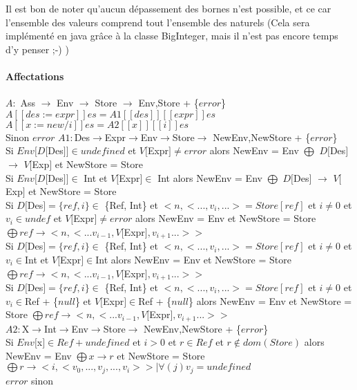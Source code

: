 Il est bon de noter qu'aucun dépassement des bornes n'est possible, et ce car l'ensemble des valeurs comprend tout l'ensemble des naturels (Cela sera implémenté en java grâce à la classe BigInteger, mais il n'est pas encore temps d'y penser ;-) )

\paragraph{Affectations} $A :$ Ass $\rightarrow$  Env $\rightarrow$ Store $\rightarrow$ {Env,Store} + \{$error$\}  \\
$A[[des := expr]] e s = A1[[des]][[expr]] e s$\\
$A[[x := new/i ]] e s = A2[[x]][[i]] e s$\\
Sinon $error$
\newline
$A1 : $Des$ \rightarrow $Expr$ \rightarrow $Env$ \rightarrow $Store$ \rightarrow$ {NewEnv,NewStore} + \{$error$\} \\ 
Si $Env[D[$Des$]] \in {undefined}$ et $V[$Expr$] \neq error$ alors NewEnv = Env $\bigoplus$ $D[$Des$]$ $\rightarrow$ $V[$Exp$]$ et NewStore = Store\\
\newline
Si $Env[D[$Des$]] \in$ Int et $V[$Expr$] \in$ Int alors NewEnv = Env $\bigoplus$ $D[$Des$]$ $\rightarrow$ $V[$Exp$]$ et NewStore = Store\\
\newline
Si $D[$Des$] = \{ref, i\} \in$ \{Ref, Int\} et $<n,<...,v_i,...> = Store[ref]$ et $i \neq 0$ et $v_i \in {undef}$ et $V[$Expr$] \neq error$ alors NewEnv = Env et NewStore = Store $\bigoplus ref \rightarrow <n,<...v_{i-1},V[$Expr$],v_{i+1}...>>$\\ 
\newline
Si $D[$Des$] = \{ref, i\} \in$ \{Ref, Int\} et $<n,<...,v_i,...> = Store[ref]$ et $i \neq 0$ et $v_i \in$Int et $V[$Expr$] \in $Int alors NewEnv = Env et NewStore = Store $\bigoplus ref \rightarrow <n,<...v_{i-1},V[$Expr$],v_{i+1}...>>$\\ 
\newline
Si $D[$Des$] = \{ref, i\} \in$ \{Ref, Int\} et $<n,<...,v_i,...> = Store[ref]$ et $i \neq 0$ et $v_i \in$Ref + \{$null$\} et $V[$Expr$] \in $Ref + \{$null$\} alors NewEnv = Env et NewStore = Store $\bigoplus ref \rightarrow <n,<...v_{i-1},V[$Expr$],v_{i+1}...>>$\\ 
\newline
$A2 : $X$ \rightarrow $Int$ \rightarrow $Env$ \rightarrow $Store$ \rightarrow$ {NewEnv,NewStore} + \{$error$\} \\ 
Si $Env[$x$] \in Ref+{undefined}$ et $i > 0$ et $r \in Ref$ et $r \not\in dom(Store)$  alors  
	NewEnv = Env $\bigoplus x \rightarrow r$ et NewStore = Store $\bigoplus r \rightarrow <i,<v_0,...,v_j,...,v_{i}>> | \forall(j) v_j = undefined$\\
	$error$ sinon\\

